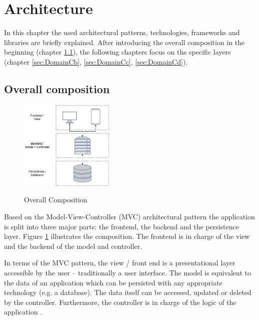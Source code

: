 
\section{Architecture}
\label{sec:DomainC}

In this chapter the used architectural patterns, technologies, frameworks and libraries are briefly explained. After introducing the overall composition in the beginning (chapter \ref{sec:DomainCa}), the following chapters focus on the specific layers (chapter \ref{sec:DomainCb}, \ref{sec:DomainCc}, \ref{sec:DomainCd}).


\subsection{Overall composition}
\label{sec:DomainCa}

\begin{figure}
	\centering
	\includegraphics[width=0.4\textwidth]{Content/Domain/OverallComposition.png}
	\caption{Overall Composition}
	\cite{own representation}
	\label{fig:overallcomposition}
\end{figure}

Based on the Model-View-Controller (\ac{MVC}) architectural pattern the application is split into three major parts: the frontend, the backend and the persistence layer. Figure \ref{fig:overallcomposition} illustrates the composition. The frontend is in charge of the view and the backend of the model and controller.

In terms of the \ac{MVC} pattern, the view / front end is a presentational layer accessible by the user – traditionally a user interface. The model is equivalent to the data of an application which can be persisted with any appropriate technology (e.g. a database). The data itself can be accessed, updated or deleted by the controller. Furthermore, the controller is in charge of the logic of the application \cite[p. 7]{steyerWebanwendungenMitASP2017}.



